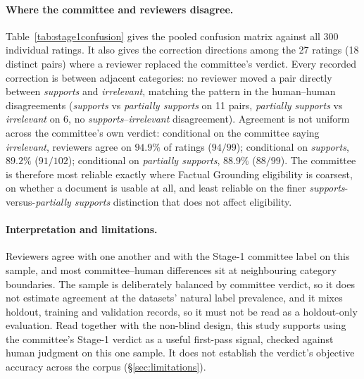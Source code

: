 \paragraph{Where the committee and reviewers disagree.} Table~\ref{tab:stage1confusion} gives the pooled confusion matrix against all 300
individual ratings. It also gives the correction directions among the 27 ratings (18
distinct pairs) where a reviewer replaced the committee's verdict. Every
recorded correction is between adjacent categories: no reviewer moved a pair
directly between \textit{supports} and \textit{irrelevant}, matching the
pattern in the human--human disagreements (\textit{supports} vs
\textit{partially supports} on 11 pairs, \textit{partially supports} vs
\textit{irrelevant} on 6, no \textit{supports}--\textit{irrelevant}
disagreement). Agreement is not uniform across the committee's own verdict:
conditional on the committee saying \textit{irrelevant}, reviewers agree on
$94.9\%$ of ratings ($94/99$); conditional on \textit{supports}, $89.2\%$
($91/102$); conditional on \textit{partially supports}, $88.9\%$ ($88/99$).
The committee is therefore most reliable exactly where Factual Grounding
eligibility is coarsest, on whether a document is usable at all, and least
reliable on the finer \textit{supports}-versus-\textit{partially supports}
distinction that does not affect eligibility.

\begin{table}[htbp]\centering

\caption{\textbf{Stage-1 review: pooled confusion matrix} (top, 300 ratings against the repeated committee label) \textbf{and correction directions} (bottom, among the 27 ratings that changed the committee's verdict).}
\label{tab:stage1confusion}
\end{table}

\paragraph{Interpretation and limitations.} Reviewers agree with one another
and with the Stage-1 committee label on this sample, and most
committee--human differences sit at neighbouring category boundaries. The
sample is deliberately balanced by committee verdict, so it does not estimate
agreement at the datasets' natural label prevalence, and it mixes holdout,
training and validation records, so it must not be read as a holdout-only
evaluation. Read together with the non-blind design, this study supports
using the committee's Stage-1 verdict as a useful first-pass signal, checked
against human judgment on this one sample. It does not establish the
verdict's objective accuracy across the corpus (\S\ref{sec:limitations}).


